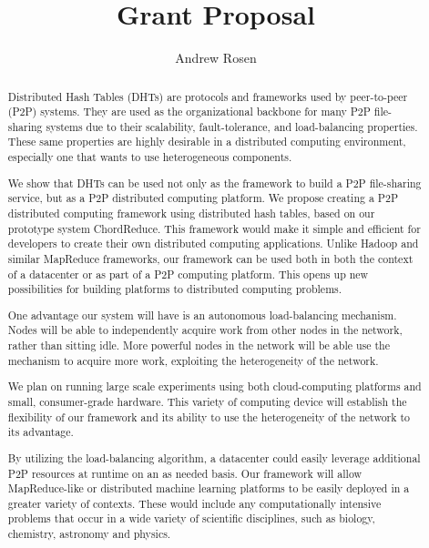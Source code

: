 \documentclass[12pt,a4paper]{article}
\author{Andrew Rosen}
\title{Grant Proposal}
\date{}
\begin{document}
\maketitle


\newpage

\begin{abstract}

Distributed Hash Tables (DHTs) are protocols and frameworks used by peer-to-peer (P2P) systems.
They are used as the organizational backbone for many P2P file-sharing systems due to their scalability, fault-tolerance, and load-balancing properties.
These same properties are highly desirable in a distributed computing environment, especially one that wants to use heterogeneous components.

We show that DHTs can be used not only as the framework to build a P2P file-sharing service, but as a P2P distributed computing platform.
We propose creating a P2P distributed computing framework using distributed hash tables, based on our prototype system ChordReduce.
This framework would make it simple and efficient for developers to create their own distributed computing applications.
Unlike Hadoop and similar MapReduce frameworks, our framework can be used both in both the context of a datacenter or as part of a P2P computing platform.  
This opens up new possibilities for building platforms to distributed computing problems.

One advantage our system will have is an autonomous load-balancing mechanism.
Nodes will be able to independently acquire work from other nodes in the network, rather than sitting idle.
More powerful nodes in the network will be able use the mechanism to acquire more work, exploiting the heterogeneity of the network.

We plan on running large scale experiments using both cloud-computing platforms and small, consumer-grade hardware.
This variety of computing device will establish the flexibility of our framework and its ability to use the heterogeneity of the network to its advantage.

By utilizing the load-balancing algorithm, a datacenter could easily leverage additional P2P resources at runtime on an as needed basis.
Our framework will allow MapReduce-like or distributed machine learning platforms to be easily deployed in a greater variety of contexts.
These would include any computationally intensive problems that occur in a wide variety of scientific disciplines, such as biology, chemistry, astronomy and physics.

\end{abstract}
\end{document}
